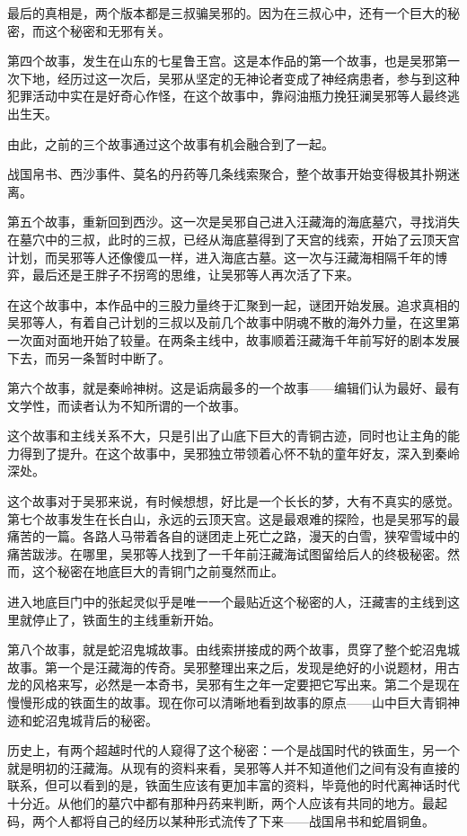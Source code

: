 最后的真相是，两个版本都是三叔骗吴邪的。因为在三叔心中，还有一个巨大的秘密，而这个秘密和无邪有关。

第四个故事，发生在山东的七星鲁王宫。这是本作品的第一个故事，也是吴邪第一次下地，经历过这一次后，吴邪从坚定的无神论者变成了神经病患者，参与到这种犯罪活动中实在是好奇心作怪，在这个故事中，靠闷油瓶力挽狂澜吴邪等人最终逃出生天。

由此，之前的三个故事通过这个故事有机会融合到了一起。

战国帛书、西沙事件、莫名的丹药等几条线索聚合，整个故事开始变得极其扑朔迷离。

第五个故事，重新回到西沙。这一次是吴邪自己进入汪藏海的海底墓穴，寻找消失在墓穴中的三叔，此时的三叔，已经从海底墓得到了天宫的线索，开始了云顶天宫计划，而吴邪等人还像傻瓜一样，进入海底古墓。这一次与汪藏海相隔千年的博弈，最后还是王胖子不拐弯的思维，让吴邪等人再次活了下来。

在这个故事中，本作品中的三股力量终于汇聚到一起，谜团开始发展。追求真相的吴邪等人，有着自己计划的三叔以及前几个故事中阴魂不散的海外力量，在这里第一次面对面地开始了较量。在两条主线中，故事顺着汪藏海千年前写好的剧本发展下去，而另一条暂时中断了。

第六个故事，就是秦岭神树。这是诟病最多的一个故事——编辑们认为最好、最有文学性，而读者认为不知所谓的一个故事。

这个故事和主线关系不大，只是引出了山底下巨大的青铜古迹，同时也让主角的能力得到了提升。在这个故事中，吴邪独立带领着心怀不轨的童年好友，深入到秦岭深处。

这个故事对于吴邪来说，有时候想想，好比是一个长长的梦，大有不真实的感觉。第七个故事发生在长白山，永远的云顶天宫。这是最艰难的探险，也是吴邪写的最痛苦的一篇。各路人马带着各自的谜团走上死亡之路，漫天的白雪，狭窄雪域中的痛苦跋涉。在哪里，吴邪等人找到了一千年前汪藏海试图留给后人的终极秘密。然而，这个秘密在地底巨大的青铜门之前戛然而止。

进入地底巨门中的张起灵似乎是唯一一个最贴近这个秘密的人，汪藏害的主线到这里就停止了，铁面生的主线重新开始。

第八个故事，就是蛇沼鬼城故事。由线索拼接成的两个故事，贯穿了整个蛇沼鬼城故事。第一个是汪藏海的传奇。吴邪整理出来之后，发现是绝好的小说题材，用古龙的风格来写，必然是一本奇书，吴邪有生之年一定要把它写出来。第二个是现在慢慢形成的铁面生的故事。现在你可以清晰地看到故事的原点——山中巨大青铜神迹和蛇沼鬼城背后的秘密。

历史上，有两个超越时代的人窥得了这个秘密：一个是战国时代的铁面生，另一个就是明初的汪藏海。从现有的资料来看，吴邪等人并不知道他们之间有没有直接的联系，但可以看到的是，铁面生应该有更加丰富的资料，毕竟他的时代离神话时代十分近。从他们的墓穴中都有那种丹药来判断，两个人应该有共同的地方。最起码，两个人都将自己的经历以某种形式流传了下来——战国帛书和蛇眉铜鱼。

